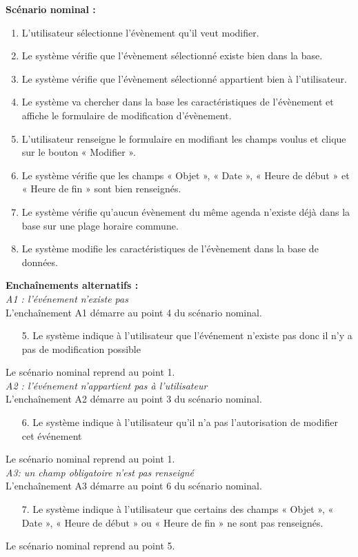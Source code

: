 \documentclass[12pt , a4paper]{article}
\begin{document}
\noindent\textbf{Scénario nominal :}
\begin{enumerate}
\item L’utilisateur sélectionne l’évènement qu’il veut modifier.
\item Le système vérifie que l’évènement sélectionné existe bien dans la base.
\item Le système vérifie que l’évènement sélectionné appartient bien à l’utilisateur.
\item Le système va chercher dans la base les caractéristiques de l’évènement et affiche le formulaire de modification d’évènement.
\item L’utilisateur renseigne le formulaire en modifiant les champs voulus et clique sur le bouton « Modifier ».
\item Le système vérifie que les champs « Objet », « Date », « Heure de début » et « Heure de fin » sont bien renseignés.
\item Le système vérifie qu’aucun évènement du même agenda n’existe déjà dans la base sur une plage horaire commune.
\item Le système modifie les caractéristiques de l’évènement dans la base de données.\\
\end{enumerate}

\noindent\textbf{Encha\^inements alternatifs :}\\
\noindent\textit{A1 : l’événement n’existe pas}\\
L'encha\^inement A1 démarre au point 4 du scénario nominal.
\begin{enumerate}
\item[5.] Le système indique à l’utilisateur que l’événement n’existe pas donc il n’y a pas de modification possible
\end{enumerate}
Le scénario nominal reprend au point 1.\\


\noindent\textit{A2 : l’événement n’appartient pas à l’utilisateur}\\
L'encha\^inement A2 démarre au point 3 du scénario nominal.
\begin{enumerate}
\item[6.] Le système indique à l’utilisateur qu’il n’a pas l’autorisation de modifier cet événement
\end{enumerate}
Le scénario nominal reprend au point 1.\\


\noindent\textit{A3: un champ obligatoire n'est pas renseigné}\\
L'encha\^inement A3 démarre au point 6 du scénario nominal.
\begin{enumerate}
\item[7.] Le système indique à l’utilisateur que certains des champs « Objet », « Date », « Heure de début » ou « Heure de fin » ne sont pas renseignés.
\end{enumerate}
Le scénario nominal reprend au point 5.\\
\end{document}
